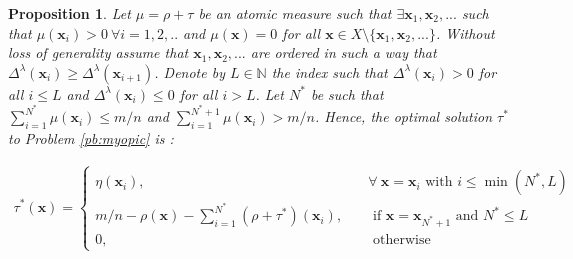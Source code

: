 \documentclass[12pt,a4paper]{article}
\newtheorem{proposition}{Proposition}
\newcommand{\bx}{\mathbf{x}}
\begin{document}
        \color{black}
		\begin{proposition} \label{prop:knapsack}
			Let $\mu=\rho+\tau$ be an atomic measure such that $\exists \bx_1,\bx_2,...$ such that $\mu(\bx_i)>0 \ \forall i=1,2,..$ and $\mu(\bx)=0$ for all $\bx \in X \setminus \{\bx_1,\bx_2,...\}$. Without loss of generality assume that $\bx_1,\bx_2,...$ are ordered in such a way that $\Delta^\lambda(\bx_{i}) \geq \Delta^\lambda(\bx_{i+1})$. Denote by $L\in \mathbb{N}$ the index such that $\Delta^\lambda(\bx_{i})>0$ for all $i\leq L$ and $\Delta^\lambda(\bx_{i})\leq 0$ for all $i > L$. Let $N^*$ be such that $\sum_{i=1}^{N^*} \mu(\bx_i)\leq m/n$ and $\sum_{i=1}^{N^*+1} \mu(\bx_i) > m/n$. Hence, the optimal solution $\tau^*$ to Problem \eqref{pb:myopic} is :
			
			\begin{align}
				\label{xi_opt}
				\tau^*(\bx)=\begin{cases}
					\eta(\bx_i), & \quad \forall \ \bx=\bx_i \mbox{ with } i\leq \min(N^*,L)\\
					m/n-\rho(\bx)-\sum_{i=1}^{N^*} (\rho+\tau^*)(\bx_i), & \quad \mbox{ if } \bx=\bx_{N^*+1} \mbox{ and } N^*\leq L\\
					0, & \quad \mbox{ otherwise}
				\end{cases}
			\end{align}
			
		\end{proposition}
		
\end{document}
